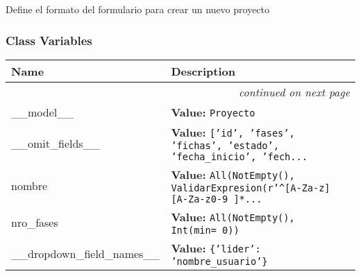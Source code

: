 Define el formato del formulario para crear un nuevo proyecto



  \subsubsection{Class Variables}

    \vspace{-1cm}
\hspace{\varindent}\begin{longtable}{|p{\varnamewidth}|p{\vardescrwidth}|l}
\cline{1-2}
\cline{1-2} \centering \textbf{Name} & \centering \textbf{Description}& \\
\cline{1-2}
\endhead\cline{1-2}\multicolumn{3}{r}{\small\textit{continued on next page}}\\\endfoot\cline{1-2}
\endlastfoot\raggedright \_\-\_\-m\-o\-d\-e\-l\-\_\-\_\- & \raggedright \textbf{Value:} 
{\tt Proyecto}&\\
\cline{1-2}
\raggedright \_\-\_\-o\-m\-i\-t\-\_\-f\-i\-e\-l\-d\-s\-\_\-\_\- & \raggedright \textbf{Value:} 
{\tt ['id', 'fases', 'fichas', 'estado', 'fecha\_inicio', 'fech\texttt{...}}&\\
\cline{1-2}
\raggedright n\-o\-m\-b\-r\-e\- & \raggedright \textbf{Value:} 
{\tt All(NotEmpty(), ValidarExpresion(r'{\textasciicircum}[A-Za-z][A-Za-z0-9 ]*\texttt{...}}&\\
\cline{1-2}
\raggedright n\-r\-o\-\_\-f\-a\-s\-e\-s\- & \raggedright \textbf{Value:} 
{\tt All(NotEmpty(), Int(min= 0))}&\\
\cline{1-2}
\raggedright \_\-\_\-d\-r\-o\-p\-d\-o\-w\-n\-\_\-f\-i\-e\-l\-d\-\_\-n\-a\-m\-e\-s\-\_\-\_\- & \raggedright \textbf{Value:} 
{\tt \{'lider': 'nombre\_usuario'\}}&\\
\cline{1-2}
\end{longtable}




